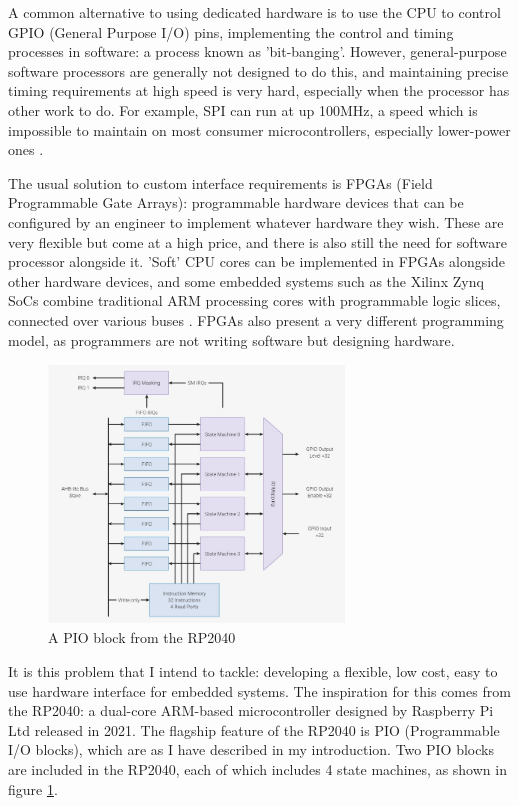 \documentclass[a4paper,fleqn,12pt]{article}
\begin{document}
A common alternative to using dedicated hardware is to use the CPU to control GPIO (General Purpose I/O) pins, implementing the control and timing processes in software: a process known as 'bit-banging'. However, general-purpose software processors are generally not designed to do this, and maintaining precise timing requirements at high speed is very hard, especially when the processor has other work to do. For example, SPI can run at up 100MHz, a speed which is impossible to maintain on most consumer microcontrollers, especially lower-power ones \cite{picosdk}.

The usual solution to custom interface requirements is FPGAs (Field Programmable Gate Arrays): programmable hardware devices that can be configured by an engineer to implement whatever hardware they wish. These are very flexible but come at a high price, and there is also still the need for software processor alongside it. 'Soft' CPU cores can be implemented in FPGAs alongside other hardware devices, and some embedded systems such as the Xilinx Zynq SoCs combine traditional ARM processing cores with programmable logic slices, connected over various buses \cite{zynq}. FPGAs also present a very different programming model, as programmers are not writing software but designing hardware.


\begin{figure}[b!]
    \centering
    \includegraphics[width=0.7\textwidth]{../img/pio-block.jpg}
    \caption{A PIO block from the RP2040 \cite{rp2040}}
    \label{fig:pio-block}
\end{figure}


It is this problem that I intend to tackle: developing a flexible, low cost, easy to use hardware interface for embedded systems. The inspiration for this comes from the RP2040: a dual-core ARM-based microcontroller designed by Raspberry Pi Ltd released in 2021. The flagship feature of the RP2040 is PIO (Programmable I/O blocks), which are as I have described in my introduction. Two PIO blocks are included in the RP2040, each of which includes 4 state machines, as shown in figure \ref{fig:pio-block}.
\end{document}

